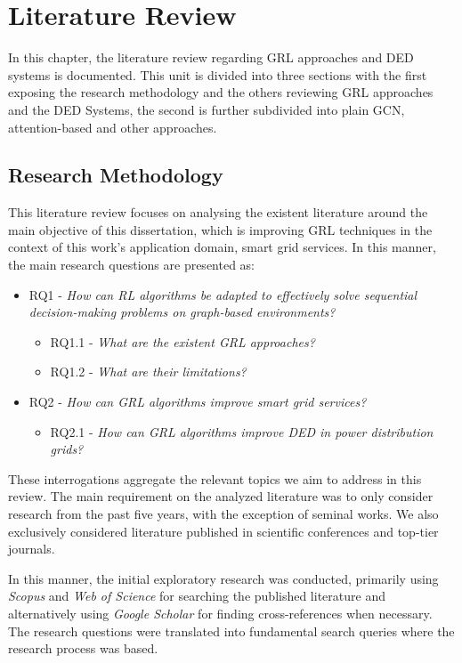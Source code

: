 \chapter{Literature Review} \label{chap:literature-review}

In this chapter, the literature review regarding \ac{GRL} approaches and \ac{DED} systems is documented. This unit is divided into three sections with the first exposing the research methodology and the others reviewing \ac{GRL} approaches and the \ac{DED} Systems, the second is further subdivided into plain \ac{GCN}, attention-based and other approaches.

\section{Research Methodology}

This literature review focuses on analysing the existent literature around the main objective of this dissertation, which is improving \ac{GRL} techniques in the context of this work's application domain, smart grid services. In this manner, the main research questions are presented as:

\begin{itemize}
	\item RQ1 - \textit{How can \ac{RL} algorithms be adapted to effectively solve sequential decision-making problems on graph-based environments?} 
	\begin{itemize}
		\item RQ1.1 - \textit{What are the existent \ac{GRL} approaches?}
		\item RQ1.2 - \textit{What are their limitations? }
	\end{itemize}
	\item RQ2 - \textit{How can \ac{GRL} algorithms improve smart grid services?}
	\begin{itemize}
		\item RQ2.1 - \textit{How can \ac{GRL} algorithms improve \acf{DED} in power distribution grids?}
	\end{itemize}
\end{itemize}

These interrogations aggregate the relevant topics we aim to address in this review. The main requirement on the analyzed literature was to only consider research from the past five years, with the exception of seminal works. We also exclusively considered literature published in scientific conferences and top-tier journals. \par
In this manner, the initial exploratory research was conducted, primarily using \textit{Scopus} and \textit{Web of Science} for searching the published literature and alternatively using \textit{Google Scholar} for finding cross-references when necessary. 
The research questions were translated into fundamental search queries where the research process was based.


